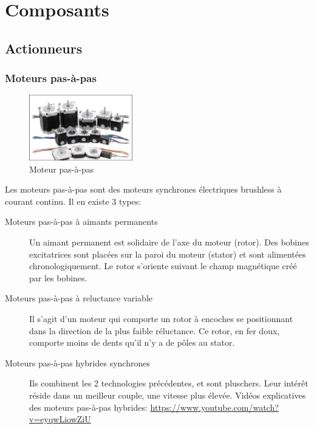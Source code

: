 \documentclass[a4paper, 11pt]{report}
\begin{document}
\part{Composants}

\chapter{Actionneurs}

\section{Moteurs pas-à-pas}

\begin{figure}[h!]
\begin{centering}
\includegraphics[width=0.4\textwidth]{images/MoteurPasAPas.png}
\caption{Moteur pas-à-pas}
\par\end{centering}
\end{figure}

Les moteurs pas-à-pas sont des moteurs synchrones électriques brushless à courant continu. Il en existe 3 types:
\begin{description}
\item[Moteurs pas-à-pas à aimants permanents] Un aimant permanent est solidaire de l'axe du moteur (rotor). Des bobines excitatrices sont placées sur la paroi du moteur (stator) et sont alimentées chronologiquement. Le rotor s'oriente suivant le champ magnétique créé par les bobines.
\item[Moteurs pas-à-pas à reluctance variable] Il s'agit d'un moteur qui comporte un rotor à encoches se positionnant dans la direction de la plus faible réluctance. Ce rotor, en fer doux, comporte moins de dents qu'il n'y a de pôles au stator.
\item[Moteurs pas-à-pas hybrides synchrones]Ils combinent les 2 technologies précédentes, et sont pluschers. Leur intérêt réside dans un meilleur couple, une vitesse plus élevée. Vidéos explicatives des moteurs pas-à-pas hybrides: \url{https://www.youtube.com/watch?v=eyqwLiowZiU}
\end{description}
\end{document}
